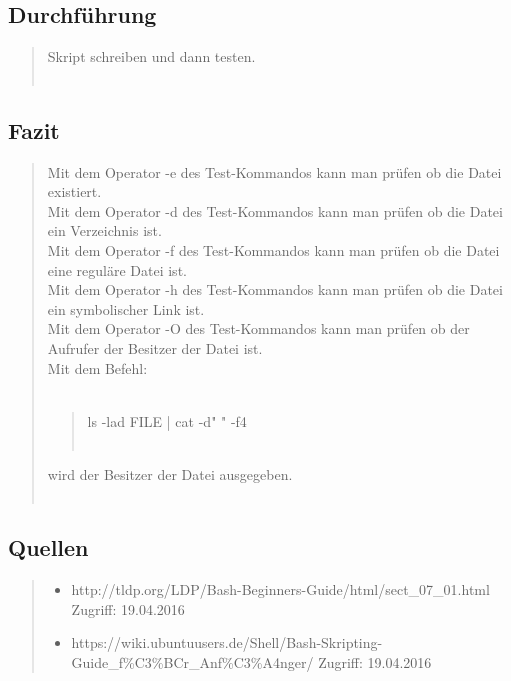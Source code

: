 	\subsection{Durchführung}
		\begin{quote}
			 Skript schreiben und dann testen.\\ \\
		\end{quote}
	\subsection{Fazit}
		\begin{quote}
			Mit dem Operator -e des Test-Kommandos kann man pr\"ufen ob die Datei existiert.\\
			Mit dem Operator -d des Test-Kommandos kann man pr\"ufen ob die Datei ein Verzeichnis ist.\\
			Mit dem Operator -f des Test-Kommandos kann man pr\"ufen ob die Datei eine regul\"are Datei ist.\\
			Mit dem Operator -h des Test-Kommandos kann man pr\"ufen ob die Datei ein symbolischer Link ist.\\
			Mit dem Operator -O des Test-Kommandos kann man pr\"ufen ob der Aufrufer der Besitzer der Datei ist.\\
			Mit dem Befehl: \\ \\
			\begin{quote}
				ls -lad FILE | cat -d" " -f4\\ \\
			\end{quote}
			wird der Besitzer der Datei ausgegeben.\\ \\
		\end{quote}
	\subsection{Quellen}
		\begin{quote}
			\begin{itemize}
				\item http://tldp.org/LDP/Bash-Beginners-Guide/html/sect\_07\_01.html Zugriff: 19.04.2016\\
				\item https://wiki.ubuntuusers.de/Shell/Bash-Skripting-Guide\_f\%C3\%BCr\_Anf\%C3\%A4nger/ Zugriff: 19.04.2016\\
			\end{itemize}
		\end{quote}
\newpage
